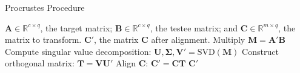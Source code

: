 \begin{algorithm}
    \caption{Procrustes Procedure}
    \label{alg:Procrustes}
    
    \begin{algorithmic}[1]
        \REQUIRE $\mathbf{A} \in \mathbb{R}^{c \times q}$, the target matrix; $\mathbf{B} \in \mathbb{R}^{c \times q}$, the testee matrix; and $\mathbf{C} \in \mathbb{R}^{m \times q}$, the matrix to transform.
        \ENSURE $\mathbf{C}'$, the matrix $\mathbf{C}$ after alignment.
        \STATE Multiply $\mathbf{M} = \mathbf{A}' \mathbf{B}$
        \STATE Compute singular value decomposition: $\mathbf{U}, \boldsymbol{\Sigma}, \mathbf{V}' = \text{SVD}(\mathbf{M})$
        \STATE Construct orthogonal matrix: $\mathbf{T} = \mathbf{V} \mathbf{U}'$
        \STATE Align $\mathbf{C}$: $\mathbf{C}' = \mathbf{CT}$
        \RETURN $\mathbf{C}'$
    \end{algorithmic}
\end{algorithm}